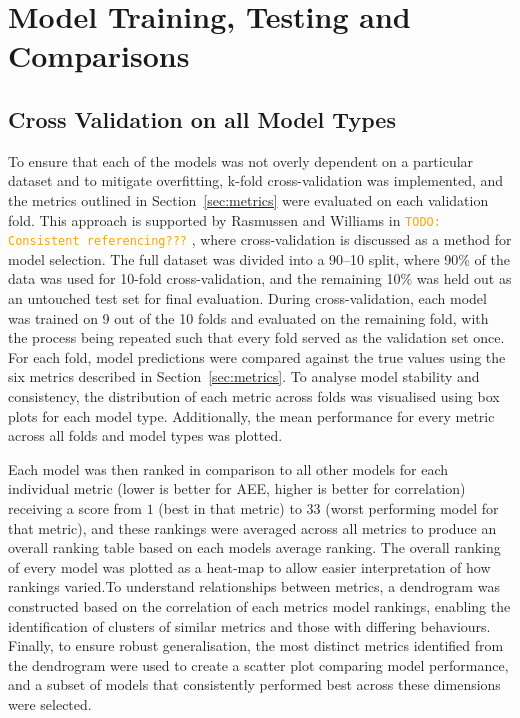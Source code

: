 \documentclass{ucdgradtaughtthesis}
\newcommand{\todo}[1]{\textcolor{orange}{\texttt{TODO: #1}}}
\begin{document}
\section{Model Training, Testing and Comparisons}
%
%
\subsection{Cross Validation on all Model Types}
To ensure that each of the models was not overly dependent on a particular dataset and to mitigate overfitting, 
k-fold cross-validation was implemented, and the metrics outlined in Section~\ref{sec:metrics} were evaluated on each validation fold. 
This approach is supported by Rasmussen and Williams in \todo{Consistent referencing???} \cite[Ch.5]{bible}, where cross-validation is discussed as a method for model selection.
The full dataset was divided into a 90--10 split, where 90\% of the data was used for 10-fold cross-validation, and the remaining 10\% was held out 
as an untouched test set for final evaluation. During cross-validation, each model was trained on 9 out of the 10 folds and evaluated on the remaining fold, 
with the process being repeated such that every fold served as the validation set once. For each fold, model predictions were compared against the true values using the six metrics
described in Section~\ref{sec:metrics}.
To analyse model stability and consistency, the distribution of each metric across folds was visualised using box plots for each model type. Additionally, the mean performance for every metric 
across all folds and model types was plotted.

Each model was then ranked in comparison to all other models for each individual metric (lower is better for AEE, higher is better for correlation) receiving a score from \(1\) (best in that metric)
to \(33\) (worst performing model for that metric), and these rankings were averaged across all metrics to produce an overall ranking table based on each models average ranking.
The overall ranking of every model was plotted as a heat-map to allow easier interpretation
of how rankings varied.To understand relationships between metrics, a dendrogram was constructed based on the correlation of each metrics model rankings, 
enabling the identification of clusters of similar metrics and those with differing behaviours. 
Finally, to ensure robust generalisation, the most distinct metrics identified from the dendrogram were used to 
create a scatter plot comparing model performance, and a subset of models that consistently performed best across these dimensions were selected.
\end{document}
